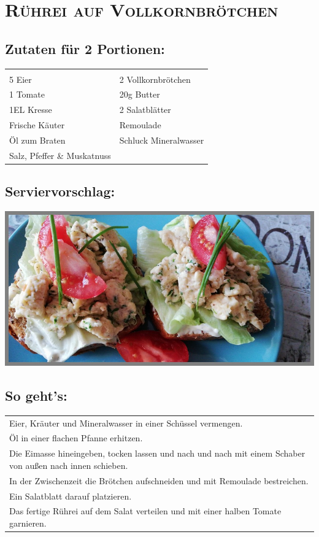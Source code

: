 \section{\textsc{Rührei auf Vollkornbrötchen}}

\subsection*{Zutaten für 2 Portionen:}

\begin{tabular}{p{7.5cm} p{7.5cm}}
	& \\
	5 Eier & 2 Vollkornbrötchen \\
	1 Tomate & 20g Butter \\
  1EL Kresse & 2 Salatblätter \\
  Frische Käuter & Remoulade \\
  Öl zum Braten & Schluck Mineralwasser \\
  Salz, Pfeffer \& Muskatnuss
\end{tabular}

\subsection*{Serviervorschlag:}

\includegraphics[width=\textwidth]{img/ruehrei_vollkorn.jpeg} \cite{ruehreivollkorn}

\subsection*{So geht's:}

\begin{tabular}{p{15cm}}
	\\
  Eier, Kräuter und Mineralwasser in einer Schüssel vermengen.\\
  Öl in einer flachen Pfanne erhitzen.\\
  Die Eimasse hineingeben, tocken lassen und nach und nach mit einem Schaber von außen nach innen schieben.\\
  In der Zwischenzeit die Brötchen aufschneiden und mit Remoulade bestreichen.\\
  Ein Salatblatt darauf platzieren.\\
  Das fertige Rührei auf dem Salat verteilen und mit einer halben Tomate garnieren.
\end{tabular}
